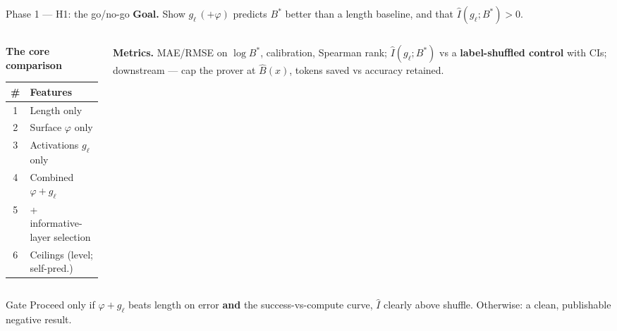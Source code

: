 \documentclass[aspectratio=169,12pt,t,compress]{beamer}
\newcommand{\good}[1]{\cellcolor{HSEGreen!18}#1}
\begin{document}
\begin{frame}{Phase 1 --- H1: the go/no-go}
	\footnotesize\textbf{Goal.} Show $g_\ell\,(+\varphi)$ predicts $B^*$ better
	than a length baseline, and that $\hat{I}(g_\ell; B^*) > 0$.

	\vspace{0.2em}
	\begin{columns}[T]
		\begin{column}{0.47\textwidth}
			\footnotesize
			\textbf{The core comparison}
			\renewcommand{\arraystretch}{1.05}
			\begin{tabular}{c l}
				\toprule
				\# & \textbf{Features} \\
				\midrule
				1 & Length only \\
				2 & Surface $\varphi$ only \\
				3 & Activations $g_\ell$ only \\
				4 & \good{Combined $\varphi + g_\ell$} \\
				5 & + informative-layer selection \\
				6 & Ceilings (level; self-pred.) \\
				\bottomrule
			\end{tabular}
		\end{column}
		\begin{column}{0.53\textwidth}
			\footnotesize
			\textbf{Metrics.} MAE/RMSE on $\log B^*$, calibration, Spearman
			rank; $\hat{I}(g_\ell; B^*)$ vs a \textbf{label-shuffled control} with
			CIs; downstream --- cap the prover at $\hat{B}(x)$, tokens saved vs
			accuracy retained.
		\end{column}
	\end{columns}

	\vspace{0.2em}
	\begin{alertblock}{Gate}
		\footnotesize
		Proceed only if $\varphi + g_\ell$ beats length on error \textbf{and} the
		success-vs-compute curve, $\hat{I}$ clearly above shuffle. Otherwise: a
		clean, publishable negative result.
	\end{alertblock}
\end{frame}
\end{document}
